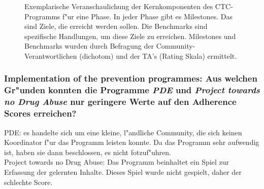 \begin{figure}[hb!]
        \begin{center}
        \end{center}
        \caption{Exemplarische Veranschaulichung der Kernkomponenten des CTC-Programms f"ur eine Phase. In jeder Phase gibt es Milestones. Das sind Ziele, die erreicht werden sollen. Die Benchmarks sind spezifische Handlungen, um diese Ziele zu erreichen. Milestones und Benchmarks wurden durch Befragung der Community-Verantwortlichen (dichotom) und der TA's (Rating Skala) ermittelt.}
        \label{fig:fagan1}
\end{figure}

\subsubsection{Implementation of the prevention programmes: Aus welchen Gr"unden konnten die Programme \emph{PDE} und \emph{Project towards no Drug Abuse} nur geringere Werte auf den Adherence Scores erreichen?}
PDE: es handelte sich um eine kleine, l"andliche Community, die sich keinen Koordinator f"ur das Programm leisten konnte. Da das Programm sehr aufwendig ist, haben sie dann beschlossen, es nicht fotzuf"uhren.\\
Project towards no Drug Abuse: Das Programm beinhaltet ein Spiel zur Erfassung der gelernten Inhalte. Dieses Spiel wurde nicht gespielt, daher der schlechte Score.

